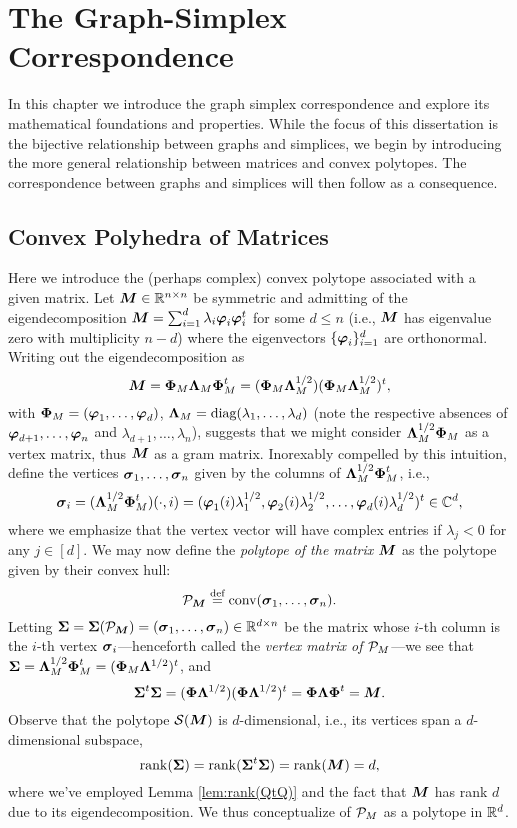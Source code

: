 \chapter{The Graph-Simplex Correspondence}
\label{chap:correspondence}

In this chapter we introduce the graph simplex correspondence and explore its mathematical foundations and properties. While the focus of this dissertation is the bijective relationship between graphs and simplices, we begin by introducing the more general relationship between matrices and convex polytopes. The correspondence between graphs and simplices will then follow as a consequence. 


\section{Convex Polyhedra of Matrices}
\label{sec:correspondence_polyhedra_matrices}
Here we introduce the (perhaps complex) convex polytope associated with a given matrix. Let $\M\in \R^{n\times n}$ be symmetric and admitting of the eigendecomposition $\M=\sum_{i=1}^d \lambda_i \eig_i\eig_i^\tp$ for some $d\leq n$ (i.e., $\M$ has eigenvalue zero with multiplicity $n-d$) where the eigenvectors $\{\eig_i\}_{i=1}^d $ are orthonormal. Writing out the eigendecomposition as 
\[\M=\Eig_M\Eval_M\Eig_M^\tp=(\Eig_M\Eval_M^{1/2})(\Eig_M\Eval_M^{1/2})^\tp,\]
with $\Eig_M = (\vp_1,\dots,\vp_d)$, $\Eval_M=\diag(\lambda_1,\dots,\lambda_d)$ (note the respective absences of $\vp_{d+1},\dots,\vp_n$ and $\lambda_{d+1},\dots,\lambda_n$), suggests that we might consider $\Eval_M^{1/2}\Eig_M$ as a vertex matrix, thus $\M$ as a gram matrix. 
Inorexably compelled by this intuition, define the vertices $\sv_1,\dots,\sv_n$ given by the columns of $\Eval_M^{1/2}\Eig_M^\tp$, i.e.,  
\begin{equation*}
    \sv_i = (\Eval_M^{1/2}\Eig_M^\tp) (\cdot,i) = (\eig_1(i)\lambda_1^{1/2}, \eig_2(i)\lambda_2^{1/2},\dots,\eig_d(i)\lambda_d^{1/2})^\tp\in \C^d,
\end{equation*}
where we emphasize that the vertex vector will have complex entries if $\lambda_j<0$ for any $j\in[d]$. We may now define the \emph{polytope of the matrix $\M$} as the polytope given by their convex hull:
\begin{equation*}
\pol_\M\equiv \conv(\sv_1,\dots,\sv_n).
\end{equation*}
Letting $\Sv=\Sv(\pol_\M)=(\sv_1,\dots,\sv_n)\in \R^{d\times n}$ be the matrix whose $i$-th column is the $i$-th vertex $\sv_i$---henceforth called the \emph{vertex matrix of $\P_M$}---we see that 
$ \Sv=\Eval_M^{1/2}\Eig_M^\tp=(\Eig_M\Eval^{1/2})^\tp$, and 
\begin{equation*}
    \Sv^\tp \Sv=(\Eig\Eval^{1/2}) (\Eig\Eval^{1/2})^\tp = \Eig \Eval\Eig^\tp =\M.
\end{equation*}
Observe that the polytope $\splx(\M)$ is $d$-dimensional, i.e., its vertices span a $d$-dimensional subspace,
\[\rank(\Sv)=\rank(\Sv^\tp \Sv)=\rank(\M)=d,\]
where we've employed Lemma \ref{lem:rank(QtQ)} and the fact that $\M$ has rank $d$ due to its eigendecomposition. We thus conceptualize of $\P_M$ as a polytope in $\R^d$. 

